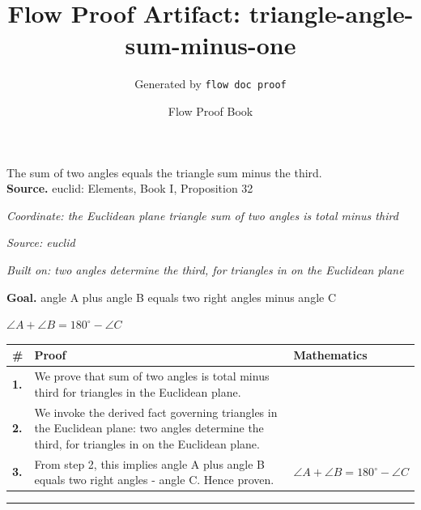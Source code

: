 \documentclass[11pt]{article}
\title{Flow Proof Artifact: triangle-angle-sum-minus-one}
\author{Generated by \texttt{flow doc proof}}
\date{Flow Proof Book}
\theoremstyle{definition}
\begin{document}
\maketitle
The sum of two angles equals the triangle sum minus the third.\\[0.5em]
\textbf{Source.} euclid: Elements, Book I, Proposition 32\\[0.5em]
\bigskip
{}\par
\smallskip\noindent\textit{Coordinate: the Euclidean plane \cdot triangle \cdot sum of two angles is total minus third}\par
\smallskip\noindent\textit{Source: euclid}\par
\smallskip\noindent\textit{Built on: two angles determine the third, for triangles in on the Euclidean plane}\par
\medskip
\noindent\textbf{Goal.} angle A plus angle B equals two right angles minus angle C\par
\noindent$\displaystyle \angle A + \angle B = 180^\circ - \angle C$\par
\medskip
\noindent
\begin{tabular}{@{} >{\raggedright\arraybackslash}p{} >{\raggedright\arraybackslash}p{} >{\raggedleft\arraybackslash}p{} @{}}
\textbf{\#} & \textbf{Proof} & \textbf{Mathematics} \\
\midrule
\textbf{1.} & We prove that sum of two angles is total minus third for triangles in the Euclidean plane. & \\[0.45em]
\textbf{2.} & We invoke the derived fact governing triangles in the Euclidean plane: two angles determine the third, for triangles in on the Euclidean plane. & \\[0.45em]
\textbf{3.} & From step 2, this implies angle A plus angle B equals two right angles - angle C. Hence proven. & $\displaystyle \angle A + \angle B = 180^\circ - \angle C$ \\[0.45em]
\bottomrule
\end{tabular}
\label{thm:Geometry-triangle-sum_of_two_angles_is_total_minus_third}
\par\medskip\hrule
\end{document}

